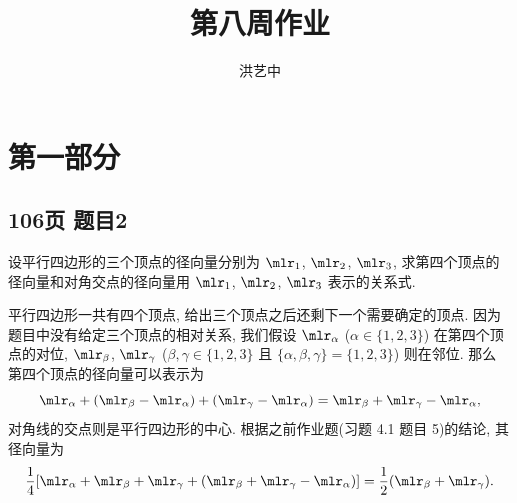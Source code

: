 \title{第八周作业}
\author{洪艺中}
\maketitle
\section{第一部分}

\subsection*{ 106页 题目2 }
\begin{problem*}
设平行四边形的三个顶点的径向量分别为 $\mlr_1$, $\mlr_2$, $\mlr_3$, 求第四个顶点的径向量和对角交点的径向量用 $\mlr_1$, $\mlr_2$, $\mlr_3$ 表示的关系式.
\end{problem*}
\begin{solution}
平行四边形一共有四个顶点, 给出三个顶点之后还剩下一个需要确定的顶点. 因为题目中没有给定三个顶点的相对关系, 我们假设 $\mlr_\alpha$ ($\alpha \in \{1, 2, 3\}$) 在第四个顶点的对位, $\mlr_\beta$, $\mlr_\gamma$ ($\beta, \gamma \in \{1, 2, 3\}$ 且 $\{\alpha, \beta, \gamma\} = \{1, 2, 3\}$) 则在邻位. 那么
第四个顶点的径向量可以表示为
\[
    \mlr_\alpha + (\mlr_\beta - \mlr_\alpha) + (\mlr_\gamma - \mlr_\alpha) = \mlr_\beta + \mlr_\gamma - \mlr_\alpha,
\]
对角线的交点则是平行四边形的中心. 根据之前作业题(习题 4.1 题目 5)的结论, 其径向量为
\[
    \frac{1}{4}[\mlr_\alpha + \mlr_\beta + \mlr_\gamma + (\mlr_\beta + \mlr_\gamma - \mlr_\alpha)] = \frac{1}{2}(\mlr_\beta + \mlr_\gamma).
\]
\end{solution}


